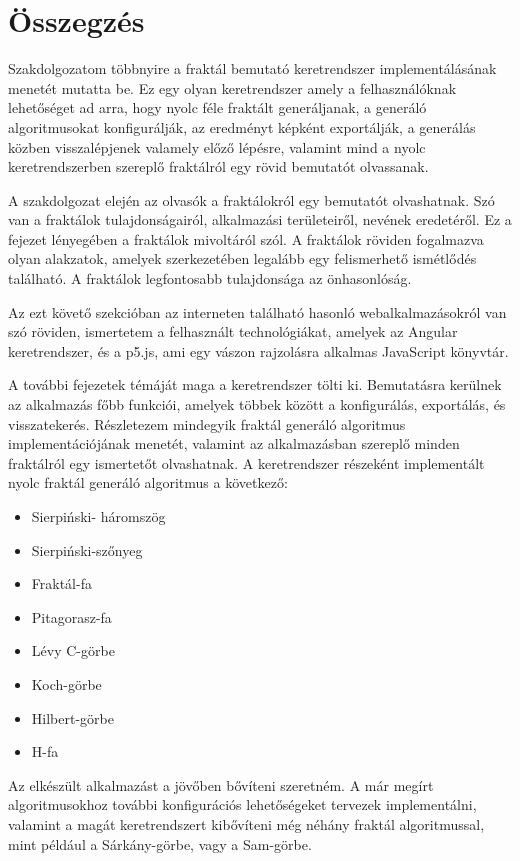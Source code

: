 \chapter*{Összegzés}
Szakdolgozatom többnyire a fraktál bemutató keretrendszer implementálásának menetét mutatta be. Ez egy olyan keretrendszer amely a felhasználóknak lehetőséget ad arra, hogy nyolc féle fraktált generáljanak, a generáló algoritmusokat konfigurálják, az eredményt képként exportálják, a generálás közben visszalépjenek valamely előző lépésre, valamint mind a nyolc keretrendszerben szereplő fraktálról egy rövid bemutatót olvassanak.
\par A szakdolgozat elején az olvasók a fraktálokról egy bemutatót olvashatnak. Szó van a fraktálok tulajdonságairól, alkalmazási területeiről, nevének eredetéről. Ez a fejezet lényegében a fraktálok mivoltáról szól. A fraktálok röviden fogalmazva olyan alakzatok, amelyek szerkezetében legalább egy felismerhető ismétlődés található. A fraktálok legfontosabb tulajdonsága az önhasonlóság.
\par Az ezt követő szekcióban az interneten található hasonló webalkalmazásokról van szó röviden, ismertetem a felhasznált technológiákat, amelyek az Angular keretrendszer, és a p5.js, ami egy vászon rajzolásra alkalmas JavaScript könyvtár. 
\par A további fejezetek témáját maga a keretrendszer tölti ki. Bemutatásra kerülnek az alkalmazás főbb funkciói, amelyek többek között a konfigurálás, exportálás, és visszatekerés. Részletezem mindegyik fraktál generáló algoritmus implementációjának menetét, valamint az alkalmazásban szereplő minden fraktálról egy ismertetőt olvashatnak. A keretrendszer részeként implementált nyolc fraktál generáló algoritmus a következő: 
\begin{itemize}
	\item Sierpiński- háromszög
	\item Sierpiński-szőnyeg
	\item Fraktál-fa
	\item Pitagorasz-fa
	\item Lévy C-görbe
	\item Koch-görbe
	\item Hilbert-görbe
	\item H-fa
\end{itemize}
\par Az elkészült alkalmazást a jövőben bővíteni szeretném. A már megírt algoritmusokhoz további konfigurációs lehetőségeket tervezek implementálni, valamint a magát keretrendszert kibővíteni még néhány fraktál algoritmussal, mint például a Sárkány-görbe, vagy a Sam-görbe.